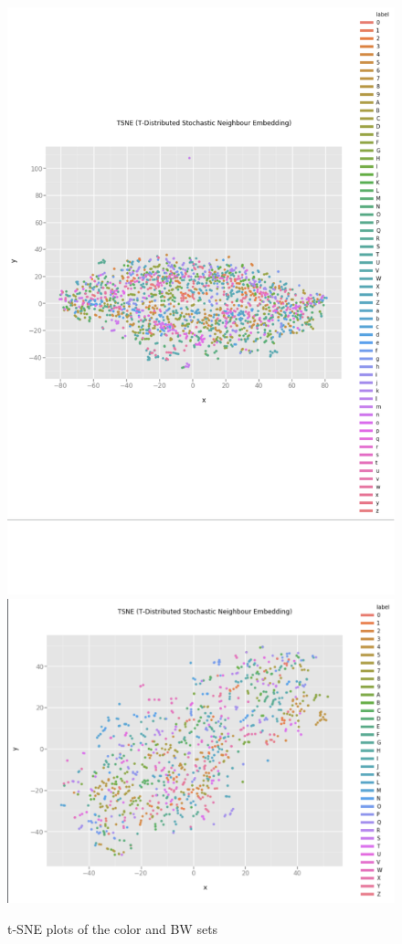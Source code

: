\documentclass[twocolumn,10pt]{article}
\begin{document}
\begin{center}
\begin{figure}
  \includegraphics[width=\linewidth]{sutd_tsne.png}
  \includegraphics[width=\linewidth]{bw_tsne.png}
  \caption{t-SNE plots of the color and BW sets}
  \label{fig:tsne}
\end{figure}
\end{center}
\end{document}

